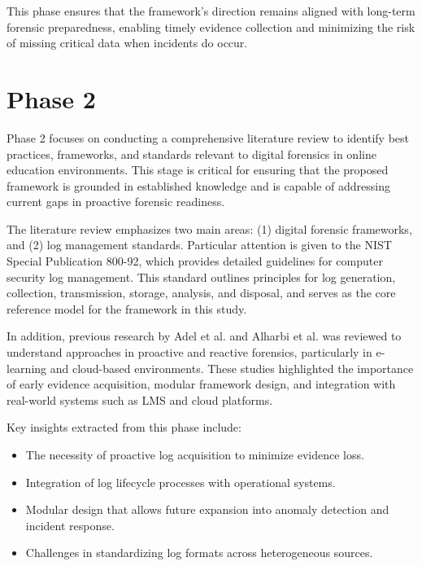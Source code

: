 This phase ensures that the framework's direction remains aligned with long-term forensic preparedness, enabling timely evidence collection and minimizing the risk of missing critical data when incidents do occur.

\section{Phase 2}
Phase 2 focuses on conducting a comprehensive literature review to identify best practices, frameworks, and standards relevant to digital forensics in online education environments. This stage is critical for ensuring that the proposed framework is grounded in established knowledge and is capable of addressing current gaps in proactive forensic readiness.

The literature review emphasizes two main areas: (1) digital forensic frameworks, and (2) log management standards. Particular attention is given to the NIST Special Publication 800-92, which provides detailed guidelines for computer security log management. This standard outlines principles for log generation, collection, transmission, storage, analysis, and disposal, and serves as the core reference model for the framework in this study.

In addition, previous research by Adel et al. and Alharbi et al. was reviewed to understand approaches in proactive and reactive forensics, particularly in e-learning and cloud-based environments. These studies highlighted the importance of early evidence acquisition, modular framework design, and integration with real-world systems such as LMS and cloud platforms.

Key insights extracted from this phase include:

\begin{itemize}
    \item The necessity of proactive log acquisition to minimize evidence loss.
    \item Integration of log lifecycle processes with operational systems.
    \item Modular design that allows future expansion into anomaly detection and incident response.
    \item Challenges in standardizing log formats across heterogeneous sources.
\end{itemize}

